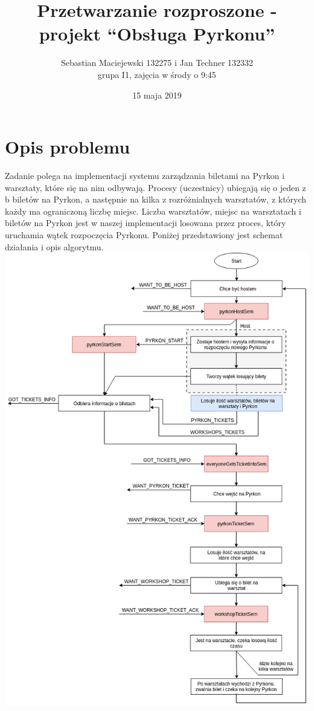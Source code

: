 \documentclass[10pt,a4paper]{article}
\author{Sebastian Maciejewski 132275 i Jan Techner 132332\\
grupa I1, zajęcia w środy o 9:45}
\title{Przetwarzanie rozproszone - projekt “Obsługa Pyrkonu”}
\date{15 maja 2019}
\begin{document}
\maketitle
\section{Opis problemu}
Zadanie polega na implementacji systemu zarządzania biletami na Pyrkon i warsztaty, które się na nim odbywają. Procesy (uczestnicy) ubiegają się o jeden z b biletów na Pyrkon,
a następnie na kilka z rozróżnialnych warsztatów, z których każdy ma ograniczoną liczbę miejsc. Liczba warsztatów, miejsc na warsztatach i biletów na Pyrkon jest
w naszej implementacji losowana przez proces, który uruchamia wątek rozpoczęcia Pyrkonu.
Poniżej przedstawiony jest schemat działania i opis algorytmu.
\newpage
\includegraphics[height=\textheight]{diagram.png}
\end{document}
